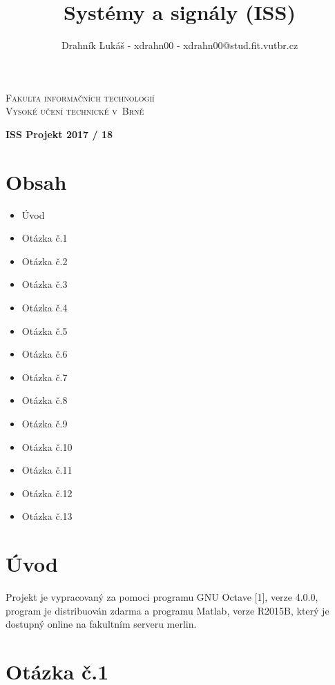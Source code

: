 \documentclass[a4paper,11pt]{article}
\begin{document}
\begin{center}
\textsc{\Huge Fakulta informačních technologií\\
Vysoké učení technické v~Brně\\}

\LARGE \title{Systémy a signály (ISS)\\}
\textbf{ISS Projekt 2017 / 18\\}

\hfill \author{Drahník Lukáš - xdrahn00 - xdrahn00@stud.fit.vutbr.cz}
\end{center}

{\let\newpage\relax\maketitle}

\newpage

\section*{Obsah}
\begin{itemize}
  \item Úvod
  \item Otázka č.1
  \item Otázka č.2
  \item Otázka č.3
  \item Otázka č.4
  \item Otázka č.5
  \item Otázka č.6
  \item Otázka č.7
  \item Otázka č.8
  \item Otázka č.9
  \item Otázka č.10
  \item Otázka č.11
  \item Otázka č.12
  \item Otázka č.13
\end{itemize}

\newpage

\section{Úvod}
Projekt je vypracovaný za pomoci programu GNU Octave [1], verze 4.0.0, program je distribuován zdarma a programu Matlab, verze R2015B, který je dostupný online na fakultním serveru merlin.

\newpage

\section{Otázka č.1}
\end{document}

